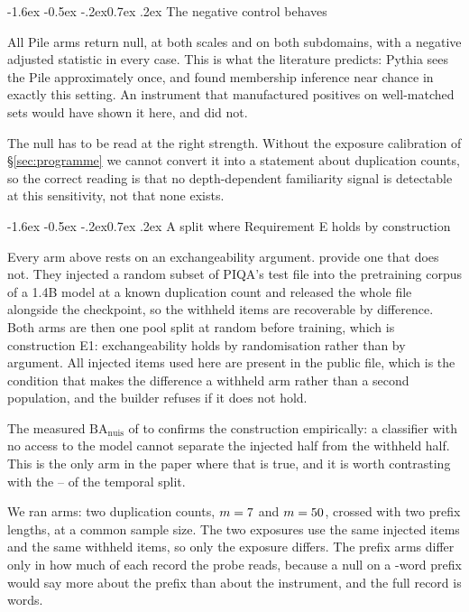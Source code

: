 \documentclass[10pt,twocolumn,letterpaper]{article}
\makeatletter
\renewcommand\subsection{\@startsection{subsection}{2}{\z@}%
  {-1.6ex \@plus -0.5ex \@minus -.2ex}{0.7ex \@plus .2ex}%
  {\normalfont\normalsize\bfseries}}
\newcommand{\BA}{\mathrm{BA}}
\newcommand{\nuis}{\mathrm{nuis}}
\makeatother
\begin{document}
\subsection{The negative control behaves}

All \PonePileNulls{} Pile arms return null, at both scales and on both
subdomains, with a negative adjusted statistic in every case. This is what the
literature predicts: Pythia sees the Pile approximately once, and
\citet{duan2024mia} found membership inference near chance in exactly this
setting. An instrument that manufactured positives on well-matched sets would
have shown it here, and did not.

The null has to be read at the right strength. Without the exposure
calibration of \S\ref{sec:programme} we cannot convert it into a statement
about duplication counts, so the correct reading is that no depth-dependent
familiarity signal is detectable at this sensitivity, not that none exists.

\subsection{A split where Requirement E holds by construction}
\label{sec:phase3}

Every arm above rests on an exchangeability argument. \citet{oren2024proving}
provide one that does not. They injected a random subset of PIQA's test file
into the pretraining corpus of a 1.4B model at a known duplication count and
released the whole file alongside the checkpoint, so the withheld items are
recoverable by difference. Both arms are then one pool split at random before
training, which is construction E1: exchangeability holds by randomisation
rather than by argument. All \PthreeNsuspect{} injected items used here are
present in the public file, which is the condition that makes the difference a
withheld arm rather than a second population, and the builder refuses if it
does not hold.



The measured $\BA_{\nuis}$ of \PthreeNuisLo{} to \PthreeNuisHi{} confirms the
construction empirically: a classifier with no access to the model cannot
separate the injected half from the withheld half. This is the only arm in the
paper where that is true, and it is worth contrasting with the
\PoneWkNuisLo{}--\PoneWkNuisHi{} of the temporal split.

We ran \PthreeN{} arms: two duplication counts, $m=7{}$ and
$m=50{}$, crossed with two prefix lengths, at a common sample size.
The two exposures use the same injected items and the same withheld items, so
only the exposure differs. The prefix arms differ only in how much of each
record the probe reads, because a null on a \PthreeWordsGoal{}-word prefix
would say more about the prefix than about the instrument, and the full record
is \PthreeWordsFull{} words.
\end{document}

